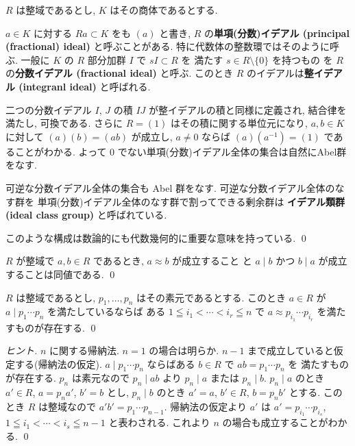 \documentclass[12pt,twoside]{jarticle}
\begin{document}
\begin{guide}
 $R$ は整域であるとし, $K$ はその商体であるとする.

 $a\in K$ に対する $Ra\subset K$ をも $(a)$ と書き, 
 $R$ の{\bf 単項(分数)イデアル (principal (fractional) ideal)} 
 と呼ぶことがある. 特に代数体の整数環ではそのように呼ぶ.
 一般に $K$ の $R$ 部分加群 $I$ で $sI\subset R$ を
 満たす $s\in R\setminus\{0\}$ を持つもの
 を $R$ の{\bf 分数イデアル (fractional ideal)} と呼ぶ.
 このとき $R$ のイデアルは{\bf 整イデアル (integranl ideal)} と呼ばれる.

 二つの分数イデアル $I$, $J$ の積 $IJ$ が整イデアルの積と同様に定義され, 
 結合律を満たし, 可換である. %
 さらに $R=(1)$ はその積に関する単位元になり, 
 $a,b\in K$ に対して $(a)(b)=(ab)$ が成立し, 
 $a\ne 0$ ならば $(a)(a^{-1})=(1)$ であることがわかる.
 よって $0$ でない単項(分数)イデアル全体の集合は自然にAbel群をなす.

 可逆な分数イデアル全体の集合も Abel 群をなす.
 可逆な分数イデアル全体のなす群を
 単項(分数)イデアル全体のなす群で割ってできる剰余群は
 {\bf イデアル類群 (ideal class group)} と呼ばれている.

 このような構成は数論的にも代数幾何的に重要な意味を持っている.
 \qed
\end{guide}

\begin{question}
 $R$ が整域で $a,b\in R$ であるとき, 
 $a\approx b$ が成立すること
 と $a\mid b$ かつ $b\mid a$ が成立することは同値である.
 \qed
\end{question}

\begin{question}[素元分解の約数, 簡単]
 $R$ は整域であるとし, $p_1,\ldots,p_n$ はその素元であるとする.
 このとき $a\in R$ が $a\mid p_1\cdots p_n$ を満たしているならば
 ある $1\leqq i_1<\cdots<i_r\leqq n$ で $a\approx p_{i_1}\cdots p_{i_r}$ 
 を満たすものが存在する. \qed
\end{question}

\begin{proof}[ヒント]
 $n$ に関する帰納法. $n=1$ の場合は明らか. 
 $n-1$ まで成立していると仮定する(帰納法の仮定).
 $a\mid p_1\cdots p_n$ ならばある $b\in R$ で $ab=p_1\cdots p_n$ を
 満たすものが存在する. 
 $p_n$ は素元なので $p_n\mid ab$ より $p_n\mid a$ または $p_n\mid b$.
 $p_n\mid a$ のとき $a'\in R$, $a=p_na'$, $b'=b$ とし, 
 $p_n\mid b$ のとき $a'=a$, $b'\in R$, $b=p_nb'$ とする.
 このとき $R$ は整域なので $a'b'=p_1\cdots p_{n-1}$.
 帰納法の仮定より $a'$ は $a'=p_{i_1}\cdots p_{i_s}$, 
 $1\leqq i_1<\cdots<i_s\leqq n-1$ と表わされる.
 これより $n$ の場合も成立することがわかる.
 \qed
\end{proof}
\end{document}
